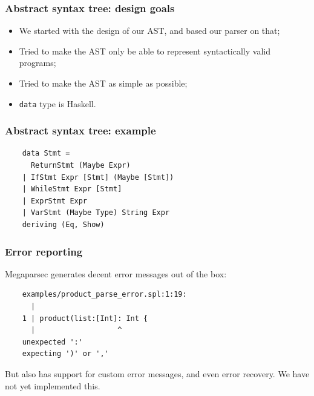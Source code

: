 \documentclass{beamer}
\begin{document}

\begin{frame}
  \frametitle{Abstract syntax tree: design goals}

  \begin{itemize}[<+->]
    \item We started with the design of our AST, and based our parser on that;
    \item Tried to make the AST only be able to represent syntactically valid programs;
    \item Tried to make the AST as simple as possible;
    \item \texttt{data} type is Haskell.
  \end{itemize}
\end{frame}

\begin{frame}[fragile]
  \frametitle{Abstract syntax tree: example}

  \begin{verbatim}
    data Stmt =
      ReturnStmt (Maybe Expr)
    | IfStmt Expr [Stmt] (Maybe [Stmt])
    | WhileStmt Expr [Stmt]
    | ExprStmt Expr
    | VarStmt (Maybe Type) String Expr
    deriving (Eq, Show)
  \end{verbatim}
\end{frame}


\begin{frame}[fragile]
  \frametitle{Error reporting}

  Megaparsec generates decent error messages out of the box:

  \begin{verbatim}
    examples/product_parse_error.spl:1:19:
      |
    1 | product(list:[Int]: Int {
      |                   ^
    unexpected ':'
    expecting ')' or ','
  \end{verbatim}

  But also has support for custom error messages, and even error recovery. We have not yet implemented this.
\end{frame}
\end{document}
